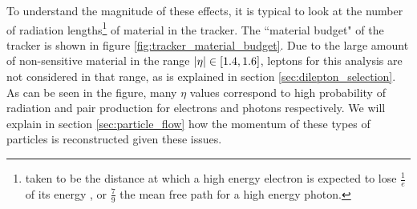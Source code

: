     To understand the magnitude of these effects, it is typical to look at the number of radiation lengths\footnote{taken to be the distance at which a high energy electron is expected to lose $\frac{1}{e}$ of its energy \cite[sec 34.4.2]{PDG}, or $\frac{7}{9}$ the mean free path for a high energy photon.} of material in the tracker. The ``material budget" of the tracker is shown in figure \ref{fig:tracker_material_budget}. Due to the large amount of non-sensitive material in the range $\lvert \eta \rvert \in [1.4,1.6]$, leptons for this analysis are not considered in that range, as is explained in section \ref{sec:dilepton_selection}. As can be seen in the figure, many $\eta$ values correspond to high probability of radiation and pair production for electrons and photons respectively. We will explain in section \ref{sec:particle_flow} how the momentum of these types of particles is reconstructed given these issues.

